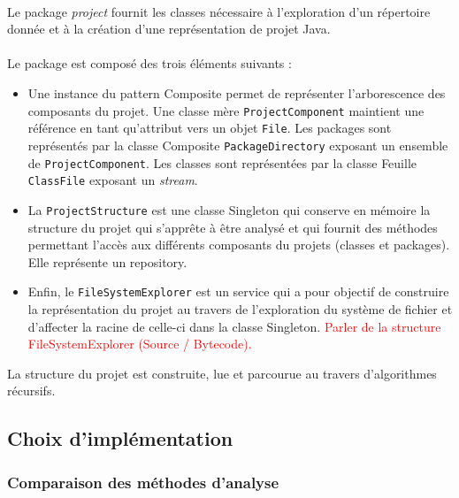\documentclass{scrartcl}
\begin{document}
    \paragraph{}Le package \emph{project} fournit les classes nécessaire à l'exploration d'un répertoire donnée et à la création d'une représentation de projet Java.

    \paragraph{}Le package est composé des trois éléments suivants :
    \begin{itemize}
        \item Une instance du pattern Composite permet de représenter l’arborescence des composants du projet. Une classe mère \texttt{ProjectComponent} maintient une référence en tant qu’attribut vers un objet \texttt{File}. Les packages sont représentés par la classe Composite \texttt{PackageDirectory} exposant un ensemble de \texttt{ProjectComponent}. Les classes sont représentées par la classe Feuille \texttt{ClassFile} exposant un \emph{stream}.
        \item La \texttt{ProjectStructure} est une classe Singleton qui conserve en mémoire la structure du projet qui s’apprête à être analysé et qui fournit des méthodes permettant l’accès aux différents composants du projets (classes et packages). Elle représente un repository.
        \item Enfin, le \texttt{FileSystemExplorer} est un service qui a pour objectif de construire la représentation du projet au travers de l'exploration du système de fichier et d’affecter la racine de celle-ci dans la classe Singleton. \textcolor{red}{Parler de la structure FileSystemExplorer (Source / Bytecode).}
    \end{itemize}
    La structure du projet est construite, lue et parcourue au travers d’algorithmes récursifs.
    
    



\subsection{Choix d'implémentation}

    \subsubsection{Comparaison des méthodes d'analyse}
    \label{methodsComparison}
\end{document}
